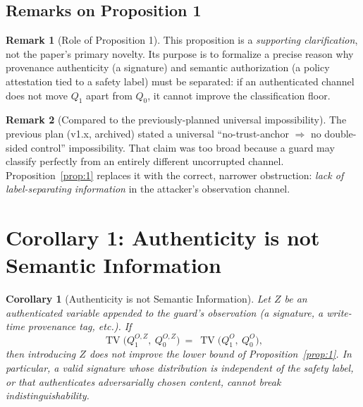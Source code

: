 \documentclass[11pt]{article}
\theoremstyle{plain}
\newtheorem{corollary}{Corollary}
\theoremstyle{definition}
\newtheorem{remark}{Remark}
\DeclareMathOperator{\TV}{TV}
\begin{document}
\subsection{Remarks on Proposition 1}

\begin{remark}[Role of Proposition 1]
This proposition is a \emph{supporting clarification}, not the paper's primary novelty. Its purpose is to
formalize a precise reason why provenance authenticity (a signature) and semantic authorization (a policy
attestation tied to a safety label) must be separated: if an authenticated channel does not move
$Q_1$ apart from $Q_0$, it cannot improve the classification floor.
\end{remark}

\begin{remark}[Compared to the previously-planned universal impossibility]
The previous plan (v1.x, archived) stated a universal ``no-trust-anchor $\Rightarrow$ no double-sided control''
impossibility. That claim was too broad because a guard may classify perfectly from an entirely different
uncorrupted channel. Proposition~\ref{prop:1} replaces it with the correct, narrower obstruction:
\emph{lack of label-separating information} in the attacker's observation channel.
\end{remark}

\section{Corollary 1: Authenticity is not Semantic Information}

\begin{corollary}[Authenticity is not Semantic Information]\label{cor:1}
Let $Z$ be an authenticated variable appended to the guard's observation (a signature, a write-time
provenance tag, etc.). If
\[
\TV\!\big(Q_1^{O, Z},\ Q_0^{O, Z}\big) \ =\ \TV\!\big(Q_1^O,\ Q_0^O\big),
\]
then introducing $Z$ does not improve the lower bound of Proposition~\ref{prop:1}. In particular, a valid
signature whose distribution is independent of the safety label, or that authenticates adversarially chosen
content, cannot break indistinguishability.
\end{corollary}
\end{document}
